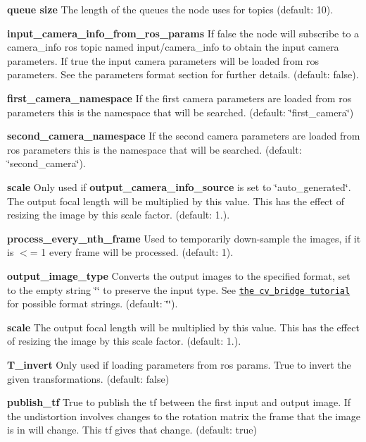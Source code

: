 \begin{DoxyItemize}
\item {\bfseries queue size} The length of the queues the node uses for topics (default\+: 10).
\item {\bfseries input\+\_\+camera\+\_\+info\+\_\+from\+\_\+ros\+\_\+params} If false the node will subscribe to a camera\+\_\+info ros topic named input/camera\+\_\+info to obtain the input camera parameters. If true the input camera parameters will be loaded from ros parameters. See the parameters format section for further details. (default\+: false).
\item {\bfseries first\+\_\+camera\+\_\+namespace} If the first camera parameters are loaded from ros parameters this is the namespace that will be searched. (default\+: \char`\"{}first\+\_\+camera\char`\"{})
\item {\bfseries second\+\_\+camera\+\_\+namespace} If the second camera parameters are loaded from ros parameters this is the namespace that will be searched. (default\+: \char`\"{}second\+\_\+camera\char`\"{}).
\item {\bfseries scale} Only used if {\bfseries output\+\_\+camera\+\_\+info\+\_\+source} is set to \char`\"{}auto\+\_\+generated\char`\"{}. The output focal length will be multiplied by this value. This has the effect of resizing the image by this scale factor. (default\+: 1.).
\item {\bfseries process\+\_\+every\+\_\+nth\+\_\+frame} Used to temporarily down-\/sample the images, if it is $<$= 1 every frame will be processed. (default\+: 1).
\item {\bfseries output\+\_\+image\+\_\+type} Converts the output images to the specified format, set to the empty string \char`\"{}\char`\"{} to preserve the input type. See \href{http://wiki.ros.org/cv_bridge/Tutorials/UsingCvBridgeToConvertBetweenROSImagesAndOpenCVImages}{\tt the cv\+\_\+bridge tutorial} for possible format strings. (default\+: \char`\"{}\char`\"{}).
\item {\bfseries scale} The output focal length will be multiplied by this value. This has the effect of resizing the image by this scale factor. (default\+: 1.).
\item {\bfseries T\+\_\+invert} Only used if loading parameters from ros params. True to invert the given transformations. (default\+: false)
\item {\bfseries publish\+\_\+tf} True to publish the tf between the first input and output image. If the undistortion involves changes to the rotation matrix the frame that the image is in will change. This tf gives that change. (default\+: true)

\end{DoxyItemize}
